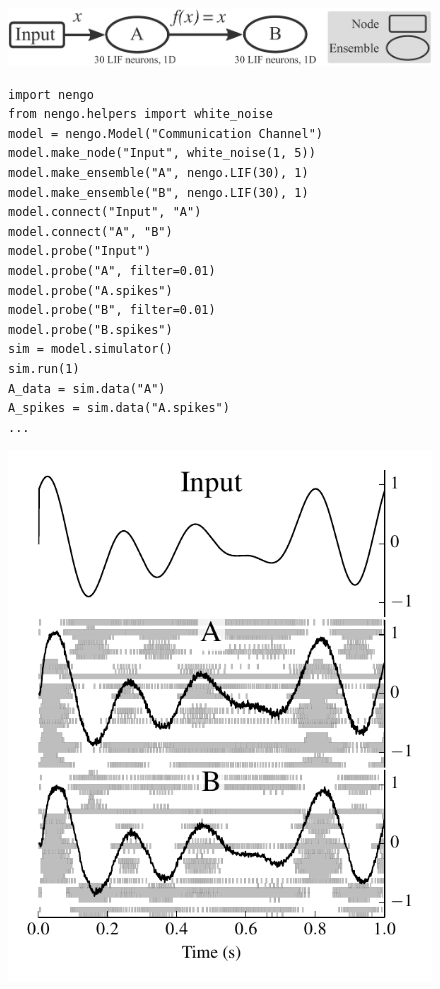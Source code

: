 \documentclass{frontiersSCNS}
\begin{document}
\begin{figure}
\begin{center}
  \includegraphics[width=.85\textwidth]{comm_channel}
  \begin{minipage}{0.48\textwidth}
    \begin{lstlisting}
import nengo
from nengo.helpers import white_noise
model = nengo.Model("Communication Channel")
model.make_node("Input", white_noise(1, 5))
model.make_ensemble("A", nengo.LIF(30), 1)
model.make_ensemble("B", nengo.LIF(30), 1)
model.connect("Input", "A")
model.connect("A", "B")
model.probe("Input")
model.probe("A", filter=0.01)
model.probe("A.spikes")
model.probe("B", filter=0.01)
model.probe("B.spikes")
sim = model.simulator()
sim.run(1)
A_data = sim.data("A")
A_spikes = sim.data("A.spikes")
...
    \end{lstlisting}
  \end{minipage}
  \begin{minipage}{0.39\textwidth}
    \includegraphics[width=\textwidth]{comm_channel_res}

\end{minipage}
\end{center}
\end{figure}
\end{document}
